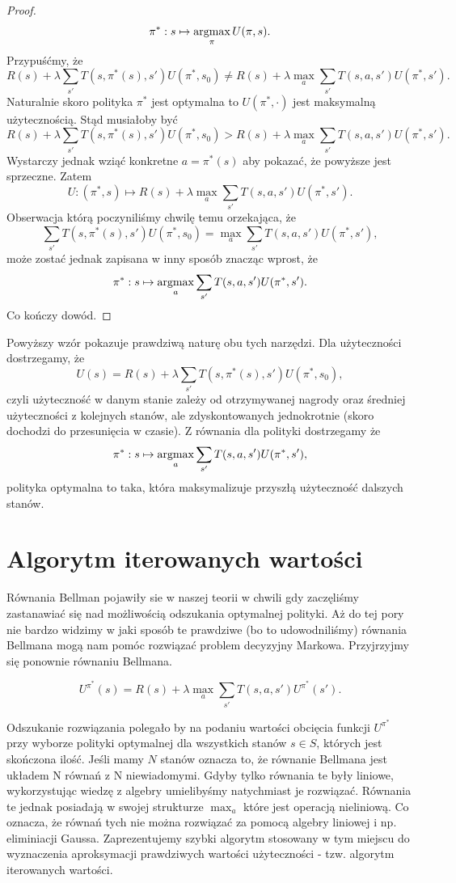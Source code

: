 \documentclass[10pt,a4paper]{book}
\newcommand{\argmax}{\operatornamewithlimits{argmax}}
\begin{document}
\begin{proof}
$$
\pi^\ast : s \mapsto \argmax_{\pi}  U(\pi,s).
$$
Przypuśćmy, że 
$$
R(s) + \lambda \sum_{s'} T(s,\pi^\ast(s), s') U(\pi^\ast, s_0) \neq 
R(s) + \lambda \max_{a} \sum_{s'} T(s,a,s') U(\pi^\ast, s').
$$
Naturalnie skoro polityka $\pi^\ast$ jest optymalna to $U(\pi^\ast, \cdot)$ jest maksymalną użytecznością. Stąd musiałoby być
$$
R(s) + \lambda \sum_{s'} T(s,\pi^\ast(s), s') U(\pi^\ast, s_0) > 
R(s) + \lambda \max_{a} \sum_{s'} T(s,a,s') U(\pi^\ast, s').
$$
Wystarczy jednak wziąć konkretne $a = \pi^\ast(s)$ aby pokazać, że powyższe jest sprzeczne. Zatem 
$$
U: (\pi^\ast, s) \mapsto R(s) + \lambda \max_{a} \sum_{s'} T(s,a,s') U(\pi^\ast, s').
$$
Obserwacja którą poczyniliśmy chwilę temu orzekająca, że 
$$
\sum_{s'} T(s,\pi^\ast(s), s') U(\pi^\ast, s_0) = \max_{a} \sum_{s'} T(s,a,s') U(\pi^\ast, s'),
$$
może zostać jednak zapisana w inny sposób znacząc wprost, że 
$$
\pi^\ast : s \mapsto \argmax_{a} \sum_{s'} T(s,a,s') U(\pi^\ast, s').
$$
Co kończy dowód.
\end{proof}

Powyższy wzór pokazuje prawdziwą naturę obu tych narzędzi.
Dla użyteczności dostrzegamy, że
$$
U(s) = R(s) + \lambda \sum_{s'} T(s,\pi^\ast(s), s') U(\pi^\ast, s_0),
$$
czyli użyteczność w danym stanie zależy od otrzymywanej nagrody oraz średniej użyteczności z kolejnych stanów, ale zdyskontowanych jednokrotnie (skoro dochodzi do przesunięcia w czasie). Z równania dla polityki dostrzegamy że
$$
\pi^\ast : s \mapsto \argmax_{a} \sum_{s'} T(s,a,s') U(\pi^\ast, s'),
$$
polityka optymalna to taka, która maksymalizuje przyszłą użyteczność dalszych stanów.

\section{Algorytm iterowanych wartości}

Równania Bellman pojawiły sie w naszej teorii w chwili gdy zaczęliśmy zastanawiać się nad możliwością odszukania optymalnej polityki. Aż do tej pory nie bardzo widzimy w jaki sposób te prawdziwe (bo to udowodniliśmy) równania Bellmana mogą nam pomóc rozwiązać problem decyzyjny Markowa. Przyjrzyjmy się ponownie równaniu Bellmana.

$$
U^{\pi^\ast}(s) = R(s) + \lambda \max_{a} \sum_{s'} T(s,a,s') U^{\pi^\ast}( s').
$$

Odszukanie rozwiązania polegało by na podaniu wartości obcięcia funkcji $U^{\pi^\ast}$ przy wyborze polityki optymalnej dla wszystkich stanów $s \in S$, których jest skończona ilość. Jeśli mamy $N$ stanów oznacza to, że równanie Bellmana jest układem N równań z N niewiadomymi. Gdyby tylko równania te były liniowe, wykorzystując wiedzę z algebry umielibyśmy natychmiast je rozwiązać. Równania te jednak posiadają w swojej strukturze $\max_{a}$ które jest operacją nieliniową. Co oznacza, że równań tych nie można rozwiązać za pomocą algebry liniowej i np. eliminiacji Gaussa. Zaprezentujemy szybki algorytm stosowany w tym miejscu do wyznaczenia aproksymacji prawdziwych wartości użyteczności - tzw. algorytm iterowanych wartości.
\end{document}
